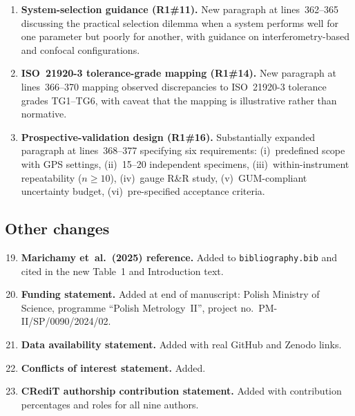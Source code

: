 \documentclass[10pt]{article}
\begin{document}
\begin{enumerate}[leftmargin=*, label=\textbf{C\arabic*.}, ref=C\arabic*]
\item \textbf{System-selection guidance (R1\#11).} New paragraph at lines~362--365 discussing the practical selection dilemma when a system performs well for one parameter but poorly for another, with guidance on interferometry-based and confocal configurations.

\item \textbf{ISO~21920-3 tolerance-grade mapping (R1\#14).} New paragraph at lines~366--370 mapping observed discrepancies to ISO~21920-3 tolerance grades TG1--TG6, with caveat that the mapping is illustrative rather than normative.

\item \textbf{Prospective-validation design (R1\#16).} Substantially expanded paragraph at lines~368--377 specifying six requirements: (i)~predefined scope with GPS settings, (ii)~15--20 independent specimens, (iii)~within-instrument repeatability ($n \geq 10$), (iv)~gauge R\&R study, (v)~GUM-compliant uncertainty budget, (vi)~pre-specified acceptance criteria.

\end{enumerate}

\subsection*{Other changes}

\begin{enumerate}[leftmargin=*, label=\textbf{C\arabic*.}, ref=C\arabic*]
\setcounter{enumi}{18}

\item \textbf{Marichamy et~al.\ (2025) reference.} Added to \texttt{bibliography.bib} and cited in the new Table~1 and Introduction text.

\item \textbf{Funding statement.} Added at end of manuscript: Polish Ministry of Science, programme ``Polish Metrology~II'', project no.~PM-II/SP/0090/2024/02.

\item \textbf{Data availability statement.} Added with real GitHub and Zenodo links.

\item \textbf{Conflicts of interest statement.} Added.

\item \textbf{CRediT authorship contribution statement.} Added with contribution percentages and roles for all nine authors.

\end{enumerate}
\end{document}
